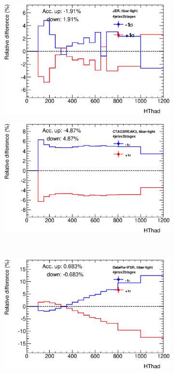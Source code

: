 \begin{figure}[tpb!]
\begin{subfigure}{0.47\textwidth}
     \includegraphics[width=\textwidth]{Analysis/Figures_ttH/ControlPlots/4jetex2btagex_ttbar-light_JER.eps}
     \caption{} \label{fig:control_JER}
  \end{subfigure}
  \begin{subfigure}{0.47\textwidth}
     \includegraphics[width=\textwidth]{Analysis/Figures_ttH/ControlPlots/4jetex3btagex_ttbar-light_CTAGBREAK3.eps}
  \caption{} \label{fig:control_Ctag3}
  \end{subfigure} 
  \\
  \begin{subfigure}{0.47\textwidth}
     \includegraphics[width=\textwidth]{Analysis/Figures_ttH/ControlPlots/4jetex2btagex_ttbar-light_DataRw-IFSR.eps}

\end{subfigure}
\end{figure}
